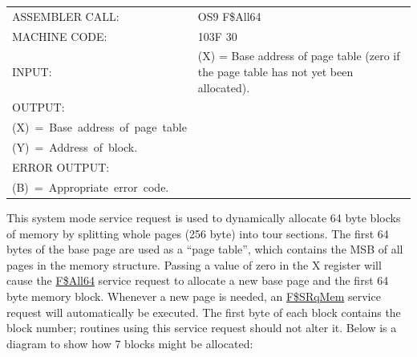 \documentclass[
]{article}
\newcounter{none} %
\begin{document}
{\def\LTcaptype{none} %
\begin{longtable}[]{@{}
  >{\raggedright\arraybackslash}p{}
  >{\raggedright\arraybackslash}p{}@{}}
\toprule\noalign{}
\endhead
\bottomrule\noalign{}
\endlastfoot
ASSEMBLER CALL: & OS9 F\$All64 \\
MACHINE CODE: & 103F 30 \\
INPUT: & (X) = Base address of page table (zero if the page table has
not yet been allocated). \\
OUTPUT: & \begin{minipage}[t]{\linewidth}\raggedright
(A)~=~Block~number\\
(X)~=~Base~address~of~page~table\\
(Y)~=~Address~of~block.
\end{minipage} \\
ERROR OUTPUT: & \begin{minipage}[t]{\linewidth}\raggedright
(CC)~=~C~bit~set.\\
(B)~=~Appropriate~error~code.
\end{minipage} \\
\end{longtable}
}

This system mode service request is used to dynamically allocate 64 byte
blocks of memory by splitting whole pages (256 byte) into tour sections.
The first 64 bytes of the base page are used as a ``page table'', which
contains the MSB of all pages in the memory structure. Passing a value
of zero in the X register will cause the \hyperref[f.all64]{F\$All64}
service request to allocate a new base page and the first 64 byte memory
block. Whenever a new page is needed, an \hyperref[f.srqmem]{F\$SRqMem}
service request will automatically be executed. The first byte of each
block contains the block number; routines using this service request
should not alter it. Below is a diagram to show how 7 blocks might be
allocated:
\end{document}
